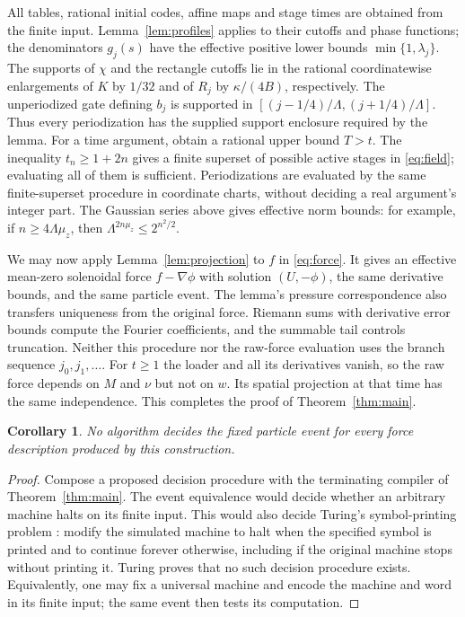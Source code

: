 \documentclass[11pt]{article}
\newtheorem{corollary}{Corollary}
\begin{document}
All tables, rational initial codes, affine maps and stage times are
obtained from the finite input. Lemma~\ref{lem:profiles} applies to
their cutoffs and phase functions; the denominators $g_j(s)$ have the
effective positive lower bounds $\min\{1,\lambda_j\}$. The supports
of $\chi$ and the rectangle cutoffs lie in the rational coordinatewise
enlargements of $K$ by $1/32$ and of $R_j$ by $\kappa/(4B)$,
respectively. The unperiodized gate defining $b_j$ is supported in
$[(j-1/4)/\Lambda,(j+1/4)/\Lambda]$. Thus every periodization has
the supplied support enclosure required by the lemma. For a time
argument, obtain a rational
upper bound $T>t$. The inequality $t_n\geq1+2n$ gives a finite superset
of possible active stages in \eqref{eq:field}; evaluating all of them
is sufficient. Periodizations are evaluated by the same finite-superset
procedure in coordinate charts, without deciding a real argument's
integer part. The Gaussian series above gives effective norm bounds:
for example, if $n\geq4\Lambda\mu_z$, then
$\Lambda^{2n\mu_z}\leq2^{n^2/2}$.

We may now apply Lemma~\ref{lem:projection} to $f$ in
\eqref{eq:force}. It gives an effective mean-zero solenoidal force
$f-\nabla\phi$ with solution $(U,-\phi)$, the same derivative bounds,
and the same particle event. The lemma's pressure correspondence
also transfers uniqueness from the original force. Riemann sums
with derivative error bounds compute the Fourier coefficients, and
the summable tail controls truncation. Neither this procedure nor the
raw-force evaluation uses the branch sequence $j_0,j_1,\ldots$.
For $t\geq1$ the loader and all its derivatives vanish, so the raw
force depends on $M$ and $\nu$ but not on $w$. Its spatial projection
at that time has the same independence.
This completes the proof of
Theorem~\ref{thm:main}.

\begin{corollary}
No algorithm decides the fixed particle event for every force description
produced by this construction.
\end{corollary}
\begin{proof}
Compose a proposed decision procedure with the terminating compiler of
Theorem~\ref{thm:main}. The event equivalence would decide whether an
arbitrary machine halts on its finite input. This would also decide
Turing's symbol-printing problem \cite[Section~8]{Turing}: modify the
simulated machine to halt when the specified symbol is printed and
to continue forever otherwise, including if the original machine stops
without printing it. Turing proves that no such decision procedure exists.
Equivalently, one may fix a universal machine and encode the machine
and word in its finite input; the same event then tests its computation.
\end{proof}
\end{document}
